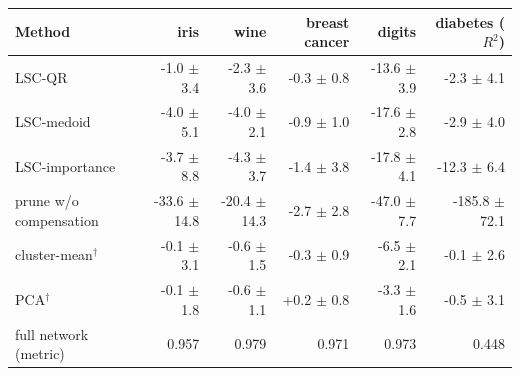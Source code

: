 \begin{tabular}{lrrrrr}\toprule
Method & iris & wine & breast cancer & digits & diabetes ($R^2$)\\\midrule
LSC-QR & -1.0 $\pm$ 3.4 & -2.3 $\pm$ 3.6 & -0.3 $\pm$ 0.8 & -13.6 $\pm$ 3.9 & -2.3 $\pm$ 4.1\\
LSC-medoid & -4.0 $\pm$ 5.1 & -4.0 $\pm$ 2.1 & -0.9 $\pm$ 1.0 & -17.6 $\pm$ 2.8 & -2.9 $\pm$ 4.0\\
LSC-importance & -3.7 $\pm$ 8.8 & -4.3 $\pm$ 3.7 & -1.4 $\pm$ 3.8 & -17.8 $\pm$ 4.1 & -12.3 $\pm$ 6.4\\
prune w/o compensation & -33.6 $\pm$ 14.8 & -20.4 $\pm$ 14.3 & -2.7 $\pm$ 2.8 & -47.0 $\pm$ 7.7 & -185.8 $\pm$ 72.1\\
cluster-mean$^\dagger$ & -0.1 $\pm$ 3.1 & -0.6 $\pm$ 1.5 & -0.3 $\pm$ 0.9 & -6.5 $\pm$ 2.1 & -0.1 $\pm$ 2.6\\
PCA$^\dagger$ & -0.1 $\pm$ 1.8 & -0.6 $\pm$ 1.1 & +0.2 $\pm$ 0.8 & -3.3 $\pm$ 1.6 & -0.5 $\pm$ 3.1\\
\midrule
full network (metric) & 0.957 & 0.979 & 0.971 & 0.973 & 0.448\\
\bottomrule\end{tabular}
